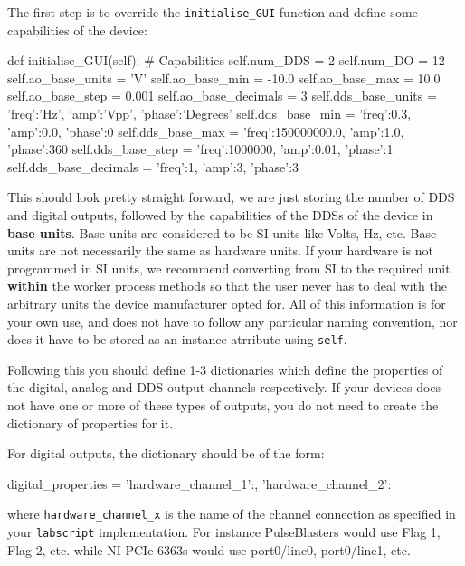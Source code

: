 \documentclass[12pt]{article}
\begin{document}
The first step is to override the \texttt{initialise\_GUI} function and define some capabilities of the device:

\begin{python}
def initialise_GUI(self):
    # Capabilities
    self.num_DDS = 2
    self.num_DO = 12
    self.ao_base_units     = 'V'
    self.ao_base_min       = -10.0
    self.ao_base_max       =  10.0
    self.ao_base_step      =  0.001
    self.ao_base_decimals  =  3
    self.dds_base_units    = {'freq':'Hz',        'amp':'Vpp', 'phase':'Degrees'}
    self.dds_base_min      = {'freq':0.3,         'amp':0.0,   'phase':0}
    self.dds_base_max      = {'freq':150000000.0, 'amp':1.0,   'phase':360}
    self.dds_base_step     = {'freq':1000000,     'amp':0.01,  'phase':1}
    self.dds_base_decimals = {'freq':1,           'amp':3,     'phase':3}
\end{python}
This should look pretty straight forward, we are just storing the number of DDS and digital outputs, followed by the capabilities of the DDSs of the device in \textbf{base units}. 
Base units are considered to be SI units like Volts, Hz, etc.
Base units are not necessarily the same as hardware units.
If your hardware is not programmed in SI units, we recommend converting from SI to the required unit \textbf{within} the worker process methods so that the user never has to deal with the arbitrary units the device manufacturer opted for.
All of this information is for your own use, and does not have to follow any particular naming convention, nor does it have to be stored as an instance atrribute using \texttt{self}.

Following this you should define 1-3 dictionaries which define the properties of the digital, analog and DDS output channels respectively.
If your devices does not have one or more of these types of outputs, you do not need to create the dictionary of properties for it.

For digital outputs, the dictionary should be of the form:
\begin{python}
    digital_properties = {'hardware_channel_1':{},
                          'hardware_channel_2':{}
                         }
\end{python}
where \texttt{hardware\_channel\_x} is the name of the channel connection as specified in your \texttt{labscript} implementation. For instance PulseBlasters would use Flag 1, Flag 2, etc. while NI PCIe 6363s would use port0/line0, port0/line1, etc.
\end{document}
